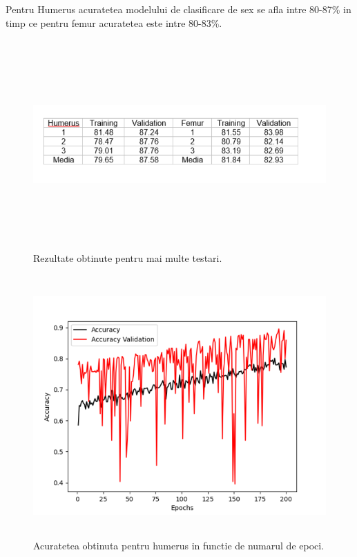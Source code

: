 \documentclass[runningheads,a4paper,11pt]{report}
\begin{document}
\noindent Pentru Humerus acuratetea modelului de clasificare de sex se afla intre 80-87\% in timp ce pentru femur acuratetea este intre 80-83\%.

\begin{figure}[h!]
\centerline{\includegraphics[height=8cm,width=20cm]{Imagini/tabel_date_acuratete.PNG}}
\caption{Rezultate obtinute pentru mai multe testari.}
\label{fig}
\end{figure}

\begin{figure}[h!]
\centerline{\includegraphics[height=10cm]{Imagini/acuratete_humerus.png}}
\caption{Acuratetea obtinuta pentru humerus in functie de numarul de epoci.}
\label{fig}
\end{figure}
\end{document}
